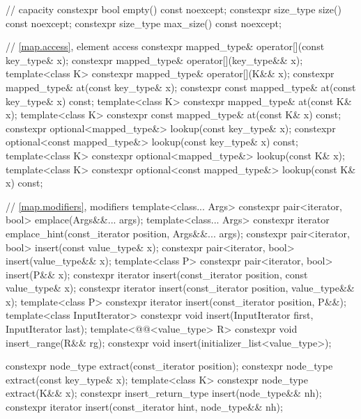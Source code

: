 \begin{codeblock}
{{    // capacity
    constexpr bool empty() const noexcept;
    constexpr size_type size() const noexcept;
    constexpr size_type max_size() const noexcept;

    // \ref{map.access}, element access
    constexpr mapped_type& operator[](const key_type& x);
    constexpr mapped_type& operator[](key_type&& x);
    template<class K> constexpr mapped_type& operator[](K&& x);
    constexpr mapped_type&       at(const key_type& x);
    constexpr const mapped_type& at(const key_type& x) const;
    template<class K> constexpr mapped_type&       at(const K& x);
    template<class K> constexpr const mapped_type& at(const K& x) const;
    constexpr optional<mapped_type&>       lookup(const key_type& x);
    constexpr optional<const mapped_type&> lookup(const key_type& x) const;
    template<class K> constexpr optional<mapped_type&>       lookup(const K& x);
    template<class K> constexpr optional<const mapped_type&> lookup(const K& x) const;

    // \ref{map.modifiers}, modifiers
    template<class... Args> constexpr pair<iterator, bool> emplace(Args&&... args);
    template<class... Args>
      constexpr iterator emplace_hint(const_iterator position, Args&&... args);
    constexpr pair<iterator, bool> insert(const value_type& x);
    constexpr pair<iterator, bool> insert(value_type&& x);
    template<class P> constexpr pair<iterator, bool> insert(P&& x);
    constexpr iterator insert(const_iterator position, const value_type& x);
    constexpr iterator insert(const_iterator position, value_type&& x);
    template<class P>
      constexpr iterator insert(const_iterator position, P&&);
    template<class InputIterator>
      constexpr void insert(InputIterator first, InputIterator last);
    template<@@<value_type> R>
      constexpr void insert_range(R&& rg);
    constexpr void insert(initializer_list<value_type>);

    constexpr node_type extract(const_iterator position);
    constexpr node_type extract(const key_type& x);
    template<class K> constexpr node_type extract(K&& x);
    constexpr insert_return_type insert(node_type&& nh);
    constexpr iterator           insert(const_iterator hint, node_type&& nh);

}}
\end{codeblock}
